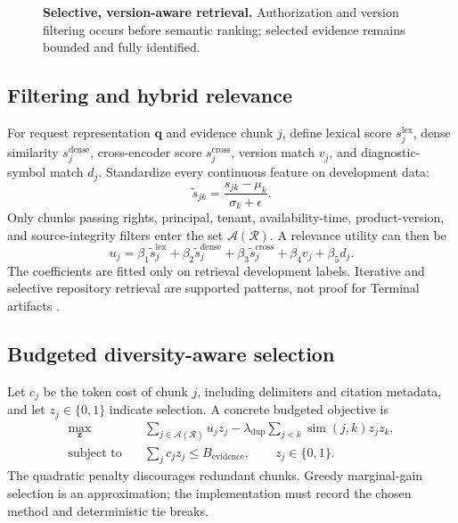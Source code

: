 \documentclass[10pt,letterpaper]{article}
\newcommand{\1}{\mathbb{1}}
\newcommand{\vect}[1]{\bm{#1}}
\begin{document}
\begin{figure}[t]
  \centering
  \resizebox{\linewidth}{!}{}
  \caption{\textbf{Selective, version-aware retrieval.}  Authorization and version filtering occurs
  before semantic ranking; selected evidence remains bounded and fully identified.}
  \label{fig:retrieval}
\end{figure}

\subsection{Filtering and hybrid relevance}

For request representation $\vect q$ and evidence chunk $j$, define lexical score $s_j^{\mathrm{lex}}$,
dense similarity $s_j^{\mathrm{dense}}$, cross-encoder score $s_j^{\mathrm{cross}}$, version match
$v_j$, and diagnostic-symbol match $d_j$.  Standardize every continuous feature on development data:
\begin{equation}
  \widetilde s_{jk}=\frac{s_{jk}-\mu_k}{\sigma_k+\epsilon}.
\end{equation}
Only chunks passing rights, principal, tenant, availability-time, product-version, and source-integrity
filters enter the set $\mathcal A(\mathcal R)$.  A relevance utility can then be
\begin{equation}
  u_j=\beta_1\widetilde s_j^{\mathrm{lex}}
      +\beta_2\widetilde s_j^{\mathrm{dense}}
      +\beta_3\widetilde s_j^{\mathrm{cross}}
      +\beta_4v_j+\beta_5d_j.
  \label{eq:retrieval-utility}
\end{equation}
The coefficients are fitted only on retrieval development labels.  Iterative and selective
repository retrieval are supported patterns, not proof for Terminal artifacts
\cite{zhang2023repocoder,wu2024repoformer,zhang2024raft}.

\subsection{Budgeted diversity-aware selection}

Let $c_j$ be the token cost of chunk $j$, including delimiters and citation metadata, and let
$z_j\in\{0,1\}$ indicate selection.  A concrete budgeted objective is
\begin{align}
  \max_{\vect z}\quad
  &\sum_{j\in\mathcal A(\mathcal R)}u_jz_j
  -\lambda_{\mathrm{dup}}\sum_{j<k}\operatorname{sim}(j,k)z_jz_k,\\
  \text{subject to}\quad
  &\sum_j c_jz_j\le B_{\mathrm{evidence}},
  \qquad z_j\in\{0,1\}.
  \label{eq:retrieval-knapsack}
\end{align}
The quadratic penalty discourages redundant chunks.  Greedy marginal-gain selection is an
approximation; the implementation must record the chosen method and deterministic tie breaks.
\end{document}

